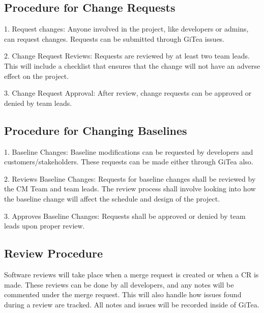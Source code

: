 \documentclass[letterpaper,12pt,oneside,listof=totoc]{scrreprt}
\begin{document}
\subsection{Procedure for Change Requests}

1. Request changes: Anyone involved in the project, like developers or admins, can request changes. Requests can be submitted through GiTea issues.

2. Change Request Reviews: Requests are reviewed by at least two team leads. This will include a checklist that ensures that the change will not have an adverse effect on the project.

3. Change Request Approval: After review, change requests can be approved or denied by team leads.


\subsection{Procedure for Changing Baselines}

1. Baseline Changes: Baseline modifications can be requested by developers and customers/stakeholders. These requests can be made either through GiTea also.

2. Reviews Baseline Changes: Requests for baseline changes shall be reviewed by the CM Team and team leads. The review process shall involve looking into how the baseline change will affect the schedule and design of the project.

3. Approves Baseline Changes: Requests shall be approved or denied by team leads upon proper review.

\subsection{Review Procedure}

Software reviews will take place when a merge request is created or when a CR is made. These reviews can be done by all developers, and any notes will be commented under the merge request. This will also handle how issues found during a review are tracked. All notes and issues will be recorded inside of GiTea.
\end{document}
